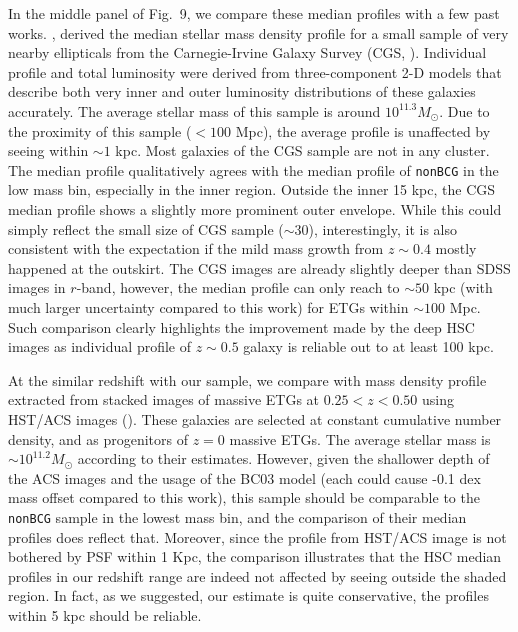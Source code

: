 \documentclass[preprint]{aastex}
\begin{document}
\begin{CJK*}{UTF8}{gbsn}
    In the middle panel of Fig.~9, we compare these median profiles with 
    a few past works.  
    \citep{Huang2013a}, derived the median stellar mass density profile 
    for a small sample of very nearby ellipticals from the 
    Carnegie-Irvine Galaxy Survey (CGS, \citealt{CGS1}).
    Individual profile and total luminosity were derived from 
    three-component 2-D models that describe both very inner and outer 
    luminosity distributions of these galaxies accurately. 
    The average stellar mass of this sample is around $10^{11.3} M_{\odot}$.
    Due to the proximity of this sample ($< 100$ Mpc), the average profile 
    is unaffected by seeing within $\sim 1$ kpc.
    Most galaxies of the CGS sample are not in any cluster.
    The median profile qualitatively agrees with the median profile of 
    \texttt{nonBCG} in the low mass bin, especially in the inner region. 
    Outside the inner 15 kpc, the CGS median profile shows a slightly more
    prominent outer envelope.  
    While this could simply reflect the small size of CGS sample ($\sim 30$),
    interestingly, it is also consistent with the expectation if the 
    mild mass growth from $z\sim 0.4$ mostly happened at the outskirt.   
    The CGS images are already slightly deeper than SDSS images in $r$-band,
    however, the median profile can only reach to $\sim 50$ kpc (with much 
    larger uncertainty compared to this work) for ETGs within $\sim 100$ Mpc.
    Such comparison clearly highlights the improvement made by the deep HSC 
    images as individual profile of $z\sim 0.5$ galaxy is reliable out to 
    at least 100 kpc.  
    
    At the similar redshift with our sample, we compare with mass density 
    profile extracted from stacked images of massive ETGs at $0.25 < z < 0.50$ 
    using HST/ACS images (\citealt{Patel2013}).  
    These galaxies are selected at constant cumulative number density, and 
    as progenitors of $z=0$ massive ETGs.  
    The average stellar mass is $\sim 10^{11.2} M_{\odot}$ according to 
    their estimates.  
    However, given the shallower depth of the ACS images and the usage of the 
    BC03 model (each could cause -0.1 dex mass offset compared to this work), 
    this sample should be comparable to the \texttt{nonBCG} sample in the
    lowest mass bin, and the comparison of their median profiles does reflect
    that.  
    Moreover, since the profile from HST/ACS image is not bothered by PSF 
    within 1 Kpc, the comparison illustrates that the HSC median profiles 
    in our redshift range are indeed not affected by seeing outside the 
    shaded region. 
    In fact, as we suggested, our estimate is quite conservative, the profiles 
    within 5 kpc should be reliable. 
  

\end{CJK*}
\end{document}
